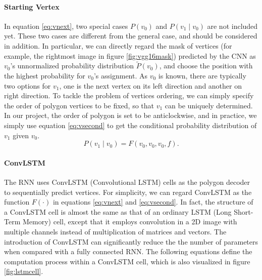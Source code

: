 \paragraph{Starting Vertex} In equation \ref{eq:vnext}, two special cases $P(v_0)$ and $P(v_1 \mid v_0)$ are not included yet. These two cases are different from the general case, and should be considered in addition. In particular, we can directly regard the mask of vertices (for example, the rightmost image in figure \ref{fig:vgg16mask}) predicted by the CNN as $v_0$'s unnormalized probability distribution $\tilde{P}(v_0)$, and choose the position with the highest probability for $v_0$'s assignment. As $v_0$ is known, there are typically two options for $v_1$, one is the next vertex on its left direction and another on right direction. To tackle the problem of vertices ordering, we can simply specify the order of polygon vertices to be fixed, so that $v_1$ can be uniquely determined. In our project, the order of polygon is set to be anticlockwise, and in practice, we simply use equation \ref{eq:vsecond} to get the conditional probability distribution of $v_1$ given $v_0$.
\begin{equation}\label{eq:vsecond}
	P(v_1 \mid v_0) = F(v_0, v_0, v_0, f).
\end{equation}

\paragraph{ConvLSTM} The RNN uses ConvLSTM (Convolutional LSTM) \cite{convlstm} cells as the polygon decoder to sequentially predict vertices. For simplicity, we can regard ConvLSTM as the function $F(\cdot)$ in equations \ref{eq:vnext} and \ref{eq:vsecond}. In fact, the structure of a ConvLSTM cell is almost the same as that of an ordinary LSTM (Long Short-Term Memory) \cite{lstm} cell, except that it employs convolution in a 2D image with multiple channels instead of multiplication of matrices and vectors. The introduction of ConvLSTM can significantly reduce the the number of parameters when compared with a fully connected RNN. The following equations define the computation process within a ConvLSTM cell, which is also visualized in figure \ref{fig:lstmcell}.




